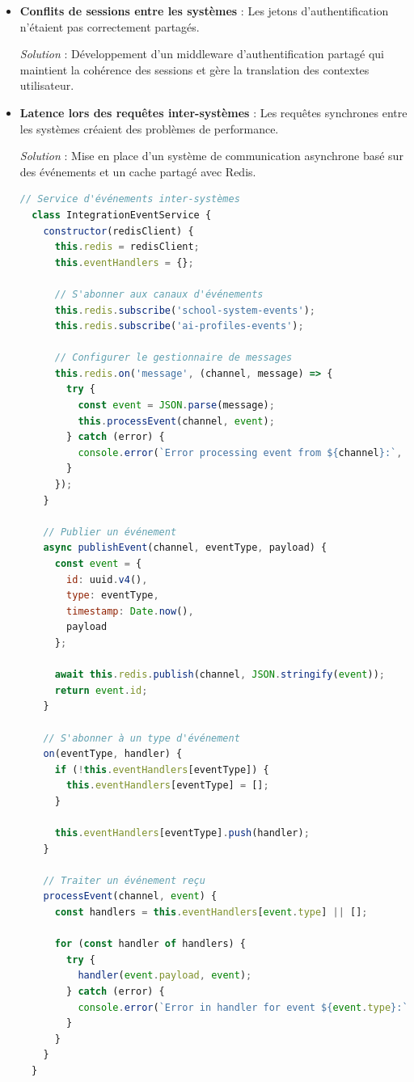 \begin{itemize}
  \item \textbf{Conflits de sessions entre les systèmes} : Les jetons d'authentification n'étaient pas correctement partagés.
  
  \textit{Solution} : Développement d'un middleware d'authentification partagé qui maintient la cohérence des sessions et gère la translation des contextes utilisateur.
  
  \item \textbf{Latence lors des requêtes inter-systèmes} : Les requêtes synchrones entre les systèmes créaient des problèmes de performance.
  
  \textit{Solution} : Mise en place d'un système de communication asynchrone basé sur des événements et un cache partagé avec Redis.
  
  \begin{lstlisting}[style=codestyle, language=JavaScript]
  // Service d'événements inter-systèmes
  class IntegrationEventService {
    constructor(redisClient) {
      this.redis = redisClient;
      this.eventHandlers = {};
      
      // S'abonner aux canaux d'événements
      this.redis.subscribe('school-system-events');
      this.redis.subscribe('ai-profiles-events');
      
      // Configurer le gestionnaire de messages
      this.redis.on('message', (channel, message) => {
        try {
          const event = JSON.parse(message);
          this.processEvent(channel, event);
        } catch (error) {
          console.error(`Error processing event from ${channel}:`, error);
        }
      });
    }
    
    // Publier un événement
    async publishEvent(channel, eventType, payload) {
      const event = {
        id: uuid.v4(),
        type: eventType,
        timestamp: Date.now(),
        payload
      };
      
      await this.redis.publish(channel, JSON.stringify(event));
      return event.id;
    }
    
    // S'abonner à un type d'événement
    on(eventType, handler) {
      if (!this.eventHandlers[eventType]) {
        this.eventHandlers[eventType] = [];
      }
      
      this.eventHandlers[eventType].push(handler);
    }
    
    // Traiter un événement reçu
    processEvent(channel, event) {
      const handlers = this.eventHandlers[event.type] || [];
      
      for (const handler of handlers) {
        try {
          handler(event.payload, event);
        } catch (error) {
          console.error(`Error in handler for event ${event.type}:`, error);
        }
      }
    }
  }
  \end{lstlisting}
\end{itemize}

